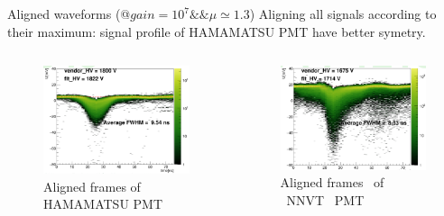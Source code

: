 \documentclass[11pt,compress,xcolor=x11names,UTF8]{beamer}
\begin{document}
\begin{frame}{Aligned waveforms (@$gain=10^7\&\&\mu\simeq 1.3$)}
Aligning all signals according to their maximum: signal profile of HAMAMATSU PMT have better symetry.
\begin{columns}
\begin{column}{.5\textwidth}
\begin{figure}
\centering
\includegraphics[width=\textwidth]{figures/hamaligned2d.png} %
\caption{Aligned frames of HAMAMATSU PMT}
\end{figure}
\end{column}
\begin{column}{.5\textwidth}
\begin{figure}
\centering
\includegraphics[width=\textwidth]{figures/mcpaligned2d.png} %
\caption{Aligned frames \ of \ NNVT \ PMT}
\end{figure}
\end{column}
\end{columns}
\end{frame}
\end{document}

